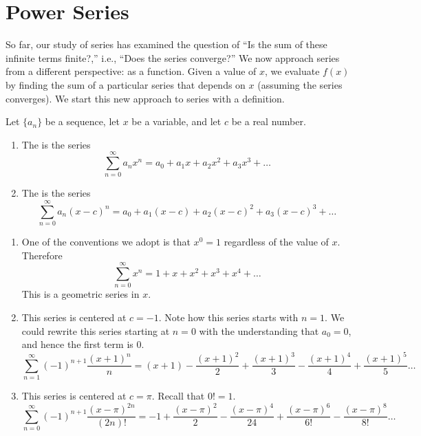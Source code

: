\section{Power Series}\label{sec:power_series}

So far, our study of series has examined the question of ``Is the sum of these infinite terms finite?,'' i.e., ``Does the series converge?'' We now approach series from a different perspective: as a function. Given a value of $x$, we evaluate $f(x)$ by finding the sum of a particular series that depends on $x$ (assuming the series converges). We start this new approach to series with a definition.

{Let $\{a_n\}$ be a sequence, let $x$ be a variable, and let $c$ be a real number.
	\begin{enumerate}
		\item The  is the series
		$$\sum_{n=0}^\infty a_nx^n = a_0+a_1x+a_2x^2+a_3x^3+\ldots$$
		
		\item The  is the series
		$$\sum_{n=0}^\infty a_n(x-c)^n = a_0+a_1(x-c)+a_2(x-c)^2+a_3(x-c)^3+\ldots$$
	\end{enumerate}
}

{\begin{enumerate}
	\item One of the conventions we adopt is that $x^0=1$ regardless of the value of $x$. Therefore
	$$\sum_{n=0}^\infty x^n = 1+x+x^2+x^3+x^4+\ldots$$
	This is a geometric series in $x$.
	
	\item	This series is centered at $c=-1$. Note how this series starts with $n=1$. We could rewrite this series starting at $n=0$ with the understanding that $a_0=0$, and hence the first term is $0$.
	$$\sum_{n=1}^\infty (-1)^{n+1}\frac{(x+1)^n}n = (x+1) - \frac{(x+1)^2}{2} + \frac{(x+1)^3}{3} - \frac{(x+1)^4}{4}+\frac{(x+1)^5}{5}\ldots$$
	
	\item		This series is centered at $c=\pi$. Recall that $0!=1$.
	$$\sum_{n=0}^\infty (-1)^{n+1} \frac{(x-\pi)^{2n}}{(2n)!} = -1+\frac{(x-\pi)^2}{2} - \frac{(x-\pi)^4}{24}+ \frac{(x-\pi)^6}{6!}-\frac{(x-\pi)^8}{8!}\ldots $$
\end{enumerate}}

